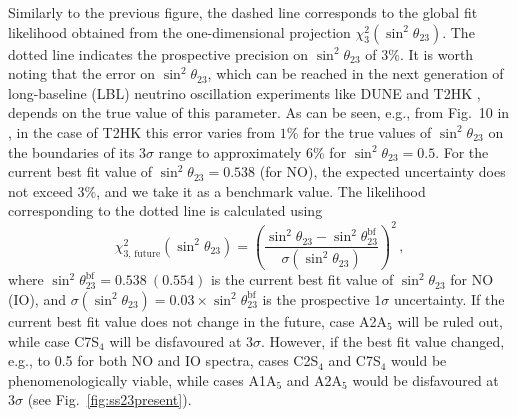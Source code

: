 \documentclass[11pt,a4paper]{article}
\newcommand{\be}{\begin{equation}}
\newcommand{\ee}{\end{equation}}
\def\th{\theta}
\numberwithin{equation}{section}
\begin{document}
 Similarly to the previous figure, the dashed line corresponds to the global fit likelihood 
obtained from the one-dimensional projection $\chi_3^2(\sin^2\th_{23})$. 
The dotted line indicates the prospective precision on $\sin^2\th_{23}$ of $3\%$.
It is worth noting that the error on $\sin^2\th_{23}$, which can be reached 
in the next generation of long-baseline (LBL) neutrino oscillation experiments 
like DUNE \cite{Acciarri:2016crz,Acciarri:2015uup} 
and T2HK \cite{Abe:2014oxa,Abe:2015zbg}, 
depends on the true value of this parameter. As can be seen, e.g., 
from Fig.~10 in \cite{Ballett:2016daj}, 
in the case of T2HK this error varies from $1\%$ 
for the true values of $\sin^2\th_{23}$ on the boundaries of its $3\sigma$ range 
to approximately $6\%$ for $\sin^2\th_{23} = 0.5$. 
For the current best fit value of $\sin^2\th_{23} = 0.538$ (for NO), 
the expected uncertainty does not exceed $3\%$, 
and we take it as a benchmark value. 
The likelihood corresponding to the dotted line is calculated using  
\be
\chi_\mathrm{3,\,future}^2\left(\sin^2\th_{23}\right) = \left(
\frac{\sin^2\th_{23} - \sin^2\th_{23}^\mathrm{bf}}{\sigma(\sin^2\th_{23})}
\right)^2\,,
\label{eq:chi2ss23future}
\ee
%
where $\sin^2\th_{23}^\mathrm{bf} = 0.538~(0.554)$
is the current best fit value of $\sin^2\th_{23}$ for NO (IO), 
and $\sigma(\sin^2\th_{23}) = 0.03 \times \sin^2\th_{23}^\mathrm{bf}$ 
is the prospective $1\sigma$ uncertainty.
If the current best fit value does not change in the future, 
case A2A$_5$ will be ruled out, 
while case C7S$_4$ will be disfavoured at $3\sigma$. 
However, if the best fit value changed, e.g., to 0.5 for both NO and IO spectra, 
cases C2S$_4$ and C7S$_4$ would be phenomenologically viable, 
while cases A1A$_5$ and A2A$_5$ would be disfavoured at $3\sigma$ 
(see Fig.~\ref{fig:ss23present}).
\end{document}
